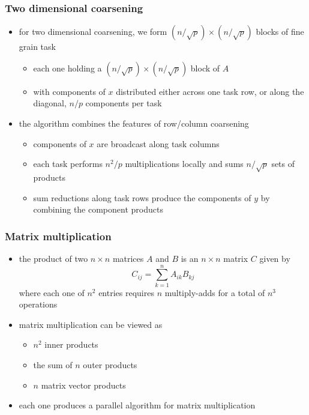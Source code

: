\begin{frame}[fragile]
%
  \frametitle{Two dimensional coarsening}
%
  \begin{itemize}
%
  \item for two dimensional coarsening, we form $(n/\sqrt{p}) \times (n/\sqrt{p})$ blocks of
    fine grain task
    \begin{itemize}
    \item each one holding a $(n/\sqrt{p}) \times (n/\sqrt{p})$ block of $A$
    \item with components of $x$ distributed either across one task row, or along the diagonal,
      $n/p$ components per task
    \end{itemize}
%
  \item the algorithm combines the features of row/column coarsening
    \begin{itemize}
    \item components of $x$ are broadcast along task columns
    \item each task performs $n^{2}/p$ multiplications locally and sums $n/\sqrt{p}$ sets of
      products
      \item sum reductions along task rows produce the components of $y$ by combining the
        component products
    \end{itemize}
%
  \end{itemize}
%
\end{frame}

\begin{frame}[fragile]
%
  \frametitle{Matrix multiplication}
%
  \begin{itemize}
%
  \item the product of two $n \times n$ matrices $A$ and $B$ is an $n \times n$ matrix $C$
    given by
    \begin{equation*}
      C_{ij} = \sum_{k=1}^{n} A_{ik} B_{kj}
    \end{equation*}
    where each one of $n^{2}$ entries requires $n$ multiply-adds for a total of $n^{3}$
    operations
%
  \item matrix multiplication can be viewed as
    \begin{itemize}
    \item $n^{2}$ inner products
    \item the sum of $n$ outer products
    \item $n$ matrix vector products
    \end{itemize}
%
  \item each one produces a parallel algorithm for matrix multiplication
%

%
  \end{itemize}
%
\end{frame}

